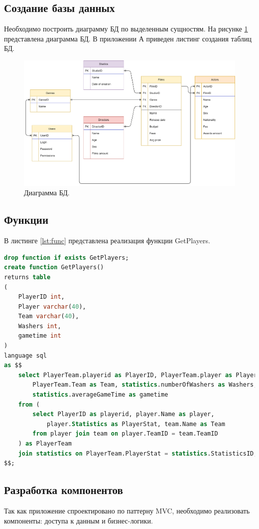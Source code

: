 \subsection{Создание базы данных}
Необходимо построить диаграмму БД по выделенным сущностям. На рисунке \ref{img:DB} представлена диаграмма БД. В приложении А приведен листинг создания таблиц БД.
\begin{figure}[h!]
	\centering
	\includegraphics[scale=0.18]{img/DB.png}
	\caption{Диаграмма БД.}
	\label{img:DB}
\end{figure}

\subsection{Функции}
В листинге \ref{lst:func} представлена реализация функции GetPlayers.
\begin{lstlisting}[label={lst:func},caption=Реализация функции GetPlayers., language=SQL]
drop function if exists GetPlayers;
create function GetPlayers()
returns table
(
	PlayerID int,
	Player varchar(40),
	Team varchar(40),
	Washers int,
	gametime int
)
language sql
as $$
	select PlayerTeam.playerid as PlayerID, PlayerTeam.player as Player, 
		PlayerTeam.Team as Team, statistics.numberOfWashers as Washers, 
		statistics.averageGameTime as gametime
	from (
		select PlayerID as playerid, player.Name as player, 
			player.Statistics as PlayerStat, team.Name as Team
		from player join team on player.TeamID = team.TeamID
	) as PlayerTeam
	join statistics on PlayerTeam.PlayerStat = statistics.StatisticsID;
$$;
\end{lstlisting}

\subsection{Разработка компонентов}
Так как приложение спроектировано по паттерну MVC, необходимо реализовать компоненты: доступа к данным и бизнес-логики.

